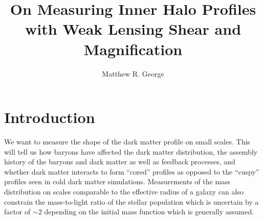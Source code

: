 \documentclass[12pt]{emulateapj}
\begin{document}
  

 \title{On Measuring Inner Halo Profiles with Weak Lensing Shear and Magnification}



\author{Matthew R. George}


  
\begin{abstract}
\end{abstract}
 



\section{Introduction}

We want to measure the shape of the dark matter profile on small
scales. This will tell us how baryons have affected the dark matter
distribution, the assembly history of the baryons and dark matter as
well as feedback processes, and whether dark matter interacts to form
``cored'' profiles as opposed to the ``cuspy'' profiles seen in cold
dark matter simulations. Measurements of the mass distribution on
scales comparable to the effective radius of a galaxy can also
constrain the mass-to-light ratio of the stellar population which is
uncertain by a factor of $\sim2$ depending on the initial mass
function which is generally assumed.
\end{document}
